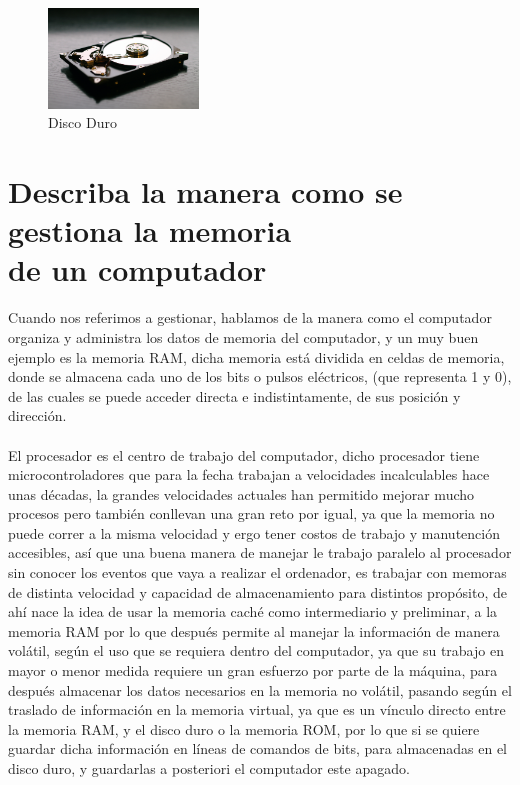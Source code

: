 \documentclass{article}
\begin{document}
	\begin{figure}[h]
		\includegraphics[width=4cm]{rom.jpg}
		\centering
		\caption{Disco Duro}
		\label{rom}
	\end{figure}
	
	\section{Describa la manera como se gestiona la memoria\\de un computador} \label{describa}
	Cuando nos referimos a gestionar, hablamos de la manera como el computador organiza y administra los datos de memoria del computador, y un muy buen ejemplo es la memoria RAM, dicha memoria está dividida en celdas de memoria, donde se almacena cada uno de los bits o pulsos eléctricos, (que representa 1 y 0), de las cuales se puede acceder directa e indistintamente, de sus posición y dirección.\cite{monografias}
	\\\\
	El procesador es el centro de trabajo del computador, dicho procesador tiene microcontroladores que para la fecha trabajan a velocidades incalculables hace unas décadas, la grandes velocidades actuales han permitido mejorar mucho procesos pero también conllevan una gran reto por igual, ya que la memoria no puede correr a la misma velocidad y ergo tener costos de trabajo y manutención accesibles, así que una buena manera de manejar le trabajo paralelo al procesador sin conocer los eventos que vaya a realizar el ordenador, \cite{youbioit} es trabajar con memoras de distinta velocidad y capacidad de almacenamiento para distintos propósito, de ahí nace la idea de usar la memoria caché como intermediario y preliminar, a la memoria RAM por lo que después permite al manejar la información de manera volátil, según el uso que se requiera dentro del computador, ya que su trabajo en mayor o menor medida requiere un gran esfuerzo por parte de la máquina, para después almacenar los datos necesarios en la memoria no volátil, pasando según el traslado de información en la memoria virtual, ya que es un vínculo directo entre la memoria RAM, y el disco duro o la memoria ROM, por lo que si se quiere guardar dicha información en líneas de comandos de bits, para almacenadas en el disco duro, y guardarlas a posteriori el computador este apagado.
\end{document}
